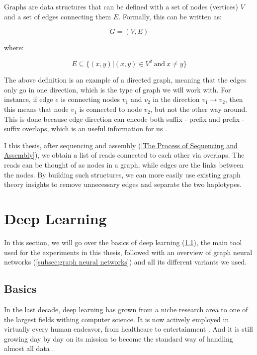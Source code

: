 \documentclass[times, utf8, diplomski, english]{fer_eng}
\begin{document}
Graphs are data structures that can be defined with a set of nodes (vertices) $V$ and a set of edges connecting them $E$. Formally, this can be written as:

\[ G = (V, E) \]

where:

\[ E \subseteq 	\{ (x, y)|(x, y) \in V^2 \mathrm{\ and\ } x \neq y \} \]

The above definition is an example of a directed graph, meaning that the edges only go in one direction, which is the type of graph we will work with. For instance, if edge $e$ is connecting nodes $v_1$ and $v_2$ in the direction $v_1 \rightarrow v_2$, then this means that node $v_1$ is connected to node $v_2$, but not the other way around. This is done because edge direction can encode both suffix - prefix and prefix - suffix overlaps, which is an useful information for us \cite{trudeau_2017}.

I this thesis, after sequencing and assembly (\ref{The Process of Sequencing and Assembly}), we obtain a list of reads connected to each other via overlaps. The reads can be thought of as nodes in a graph, while edges are the links between the nodes. By building such structures, we can more easily use existing graph theory insights to remove unnecessary edges and separate the two haplotypes.

\section{Deep Learning}

In this section, we will go over the basics of deep learning (\ref{subsec:basics}), the main tool used for the experiments in this thesis, followed with an overview of graph neural networks (\ref{subsec:graph neural networks}) and all its different variants we used.

\subsection{Basics}
\label{subsec:basics}

In the last decade, deep learning has grown from a niche research area to one of the largest fields withing computer science. It is now actively employed in virtually every human endeavor, from healthcare to entertainment \cite{dl_applications}. And it is still growing day by day on its mission to become the standard way of handling almost all data \cite{dl_growth}.
\end{document}
